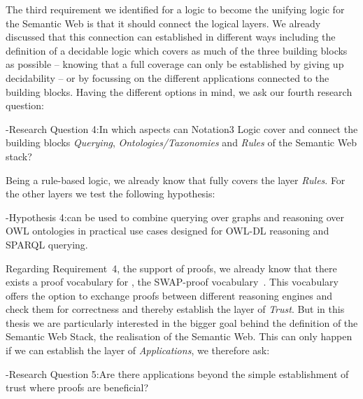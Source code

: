 The third requirement we identified for a logic to become the unifying logic for the Semantic Web is that it should connect the logical layers. 
We already discussed that this connection can established in different ways including the definition of a decidable logic which covers as much of the three building blocks 
as possible
-- knowing that a full coverage can only be established by giving up decidability -- or by focussing on the different applications connected to the building blocks.
Having the different options in mind, we ask our fourth research question:

\hyp{Research Question 4:}{In which aspects can Notation3 Logic cover and connect the building blocks \emph{Querying}, \emph{Ontologies/Taxonomies} and \emph{Rules} 
of the Semantic Web stack?}

Being a rule-based logic, we already know that \nthreelogic fully covers the layer \emph{Rules}. For the other layers we test the following hypothesis:

\hyp{Hypothesis 4:}{\nthreelogic can be used to combine querying over \rdf graphs and reasoning over OWL ontologies in practical use cases designed for OWL-DL reasoning and SPARQL querying.}

Regarding Requirement~4, the support of proofs, we already know that there exists a proof vocabulary for \nthree, the SWAP-proof vocabulary~\cite{Proof}.
This vocabulary offers the option to exchange proofs between different reasoning engines and check them for correctness and thereby establish the layer of \emph{Trust}. But in 
this thesis we are particularly interested in the bigger goal behind the definition of the Semantic Web Stack, the realisation of the Semantic Web. This can only happen 
if we can establish the layer of \emph{Applications}, we therefore ask:

\hyp{Research Question 5:}{Are there applications beyond the simple establishment of trust where proofs are beneficial?}

